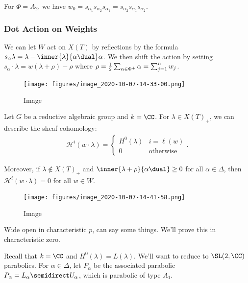 \begin{example}

For \(\Phi = A_2\), we have
\(w_0 = s_{\alpha_1} s_{\alpha_2} s_{\alpha_1} = s_{\alpha_2} s_{\alpha_1} s_{\alpha_2}\).

\end{example}

\hypertarget{dot-action-on-weights}{%
\subsubsection{Dot Action on Weights}\label{dot-action-on-weights}}

We can let \(W\) act on \(X(T)\) by reflections by the formula
\(s_\alpha \lambda = \lambda - \inner{\lambda}{\alpha\dual}\alpha\). We
then shift the action by setting
\(s_\alpha \cdot \lambda = w(\lambda+\rho)-\rho\) where
\(\rho = {1\over 2} \sum_{\alpha\in \Phi^+} \alpha = \sum_{j=1}^n w_j\).

\begin{figure}
\centering
\texttt{[image: figures/image\_2020-10-07-14-33-00.png]}
\caption{Image}
\end{figure}

\begin{theorem}

Let \(G\) be a reductive algebraic group and \(k=\CC\). For
\(\lambda \in X(T)_+\), we can describe the sheaf cohomology:
\begin{align*}  
\mathcal{H}^i(w\cdot \lambda)
=
\begin{cases}
H^0(\lambda) & i=\ell(w) \\
0 & \text{otherwise}
\end{cases}
.\end{align*}

Moreover, if \(\lambda \not\in X(T)_+\) and
\(\inner{\lambda+\rho}{\alpha\dual} \geq 0\) for all
\(\alpha \in \Delta\), then \(\mathcal{H}^i(w\cdot \lambda) = 0\) for
all \(w\in W\).

\begin{figure}
\centering
\texttt{[image: figures/image\_2020-10-07-14-41-58.png]}
\caption{Image}
\end{figure}

\end{theorem}

Wide open in characteristic \(p\), can say some things. We'll prove this
in characteristic zero.

Recall that \(k=\CC\) and \(H^0(\lambda) = L(\lambda)\). We'll want to
reduce to \(\SL(2, \CC)\) parabolics. For \(\alpha\in\Delta\), let
\(P_\alpha\) be the associated parabolic
\(P_\alpha = L_\alpha \semidirect U_\alpha\), which is parabolic of type
\(A_1\).

